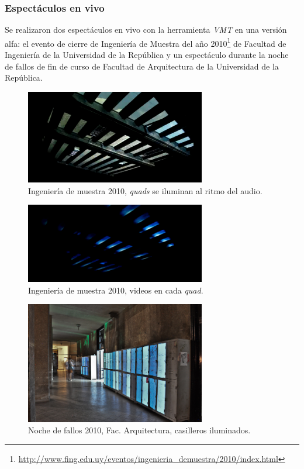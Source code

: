 \subsubsection{Espectáculos en vivo}

Se realizaron dos espectáculos en vivo con la herramienta \emph{VMT} en una versión alfa: el evento de cierre de Ingeniería de Muestra del año 2010\footnote{\url{http://www.fing.edu.uy/eventos/ingenieria_demuestra/2010/index.html}} de Facultad de Ingeniería de la Universidad de la República y un espectáculo durante la noche de fallos de fin de curso de Facultad de Arquitectura de la Universidad de la República.
\begin{figure}[H]
  \centering
    \includegraphics[width=0.7\textwidth]{./Cap7_conclusiones/ingMuestra1.png}
  \caption[Imagen propia]{Ingeniería de muestra 2010, \emph{quads} se iluminan al ritmo del audio.}
  \label{fig:ingMuestra1}
\end{figure}
\begin{figure}[H]
  \centering
    \includegraphics[width=0.7\textwidth]{./Cap7_conclusiones/ingMuestra2.png}
  \caption[Imagen propia]{Ingeniería de muestra 2010, videos en cada \emph{quad}.}
  \label{fig:ingMuestra2}
\end{figure}

\begin{figure}[H]
  \centering
    \includegraphics[width=0.7\textwidth]{./Cap7_conclusiones/Arqui1.jpg}
  \caption[http://www.farq.edu.uy/patio/conferencias-exposiciones-y-seminarios/noche-de-fallos-7.html]{Noche de fallos 2010, Fac. Arquitectura, casilleros iluminados.}
  \label{fig:Arquitectura1}
\end{figure}

